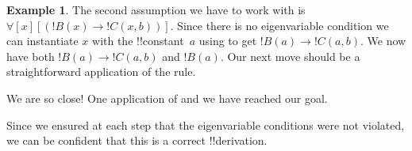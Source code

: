 \documentclass[10pt,a4paper]{article}
\theoremstyle{plain}
\theoremstyle{definition}
\newtheorem{ex}[thm]{Example}
\theoremstyle{remark}
\providecommand{\AxiomC}[1]{}
\providecommand{\UnaryInfC}[1]{}
\providecommand{\BinaryInfC}[1]{}
\providecommand{\RightLabel}[1]{}
\newenvironment{prooftree}{}{}
\providecommand{\lif}{\mathbin{\rightarrow}}
\providecommand{\lforall}{\mathord{\forall}}
\providecommand{\lexists}{\mathord{\exists}}
\providecommand{\Elim}[1]{}
\providecommand{\Intro}[1]{}
\providecommand{\Discharge}{\mathrm{Dis}}
\providecommand{\Intro}{\mathrm{I}}
\providecommand{\DischargeRule}{\mathrm{Dis}}
\providecommand{\DischargeRule}{\mathrm{Dis}}
\begin{document}
\begin{ex}
The second assumption we have to work with is~$\lforall[x][(!B(x) \lif
  !C(x,b))]$. Since there is no eigenvariable condition we can
instantiate $x$ with the !!{constant}~$a$ using \Elim{\lforall} to get
$!B(a) \lif !C(a, b)$.  We now have both $!B(a) \lif !C(a,b)$ and
$!B(a)$. Our next move should be a straightforward application of the
\Elim{\lif} rule.
\begin{prooftree}
\AxiomC{$\lexists[x][(!A(x) \land !B(x))]$}
\AxiomC{$\lforall[x][(!B(x) \lif !C(x,b))]$}
\RightLabel{\Elim{\lforall}}
\UnaryInfC{$!B(a) \lif !C(a,b)$}
\AxiomC{$\Discharge{!A(a) 
\land !B(a)}{1}$}
\RightLabel{\Elim{\land}}
\UnaryInfC{$!B(a)$}
\RightLabel{\Elim{\lif}}
\BinaryInfC{$!C(a,b)$}
\DeduceC{$\lexists[x][!C(x,b)]$}
\DischargeRule{\Elim{\lexists}}{1}
\insertBetweenHyps{\hspace{-5em}}
\BinaryInfC{$\lexists[x][!C(x,b)]$}
\end{prooftree}
We are so close!{} One application of \Intro{\lexists} and we
have reached our goal.
\begin{prooftree}
\AxiomC{$\lexists[x][(!A(x) \land !B(x))]$}
\AxiomC{$\lforall[x][(!B(x) \lif !C(x,b))]$}
\RightLabel{\Elim{\lforall}}
\UnaryInfC{$!B(a) \lif !C(a,b)$}
\AxiomC{$\Discharge{!A(a) 
\land !B(a)}{1}$}
\RightLabel{\Elim{\land}}
\UnaryInfC{$!B(a)$}
\RightLabel{\Elim{\lif}}
\BinaryInfC{$!C(a,b)$}
\RightLabel{\Intro{\lexists}}
\UnaryInfC{$\lexists[x][!C(x,b)]$}
\DischargeRule{\Elim{\lexists}}{1}
\insertBetweenHyps{\hspace{-5em}}
\BinaryInfC{$\lexists[x][!C(x,b)]$}
\end{prooftree}
Since we ensured at each step that the eigenvariable
conditions were not violated, we can be confident that this
is a correct !!{derivation}.
\end{ex}
\end{document}
